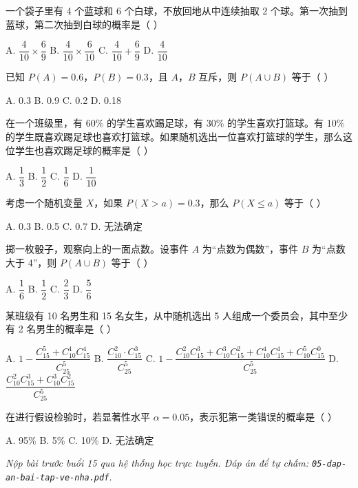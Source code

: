 \documentclass[11pt, a4paper]{article}
\begin{document}
\begin{baitap}[9]
一个袋子里有 4 个蓝球和 6 个白球，不放回地从中连续抽取 2 个球。第一次抽到蓝球，第二次抽到白球的概率是（ ）
\par\vspace{3pt}
\noindent A. $\dfrac{4}{10} \times \dfrac{6}{9}$ \quad B. $\dfrac{4}{10} \times \dfrac{6}{10}$ \quad C. $\dfrac{4}{10} + \dfrac{6}{9}$ \quad D. $\dfrac{4}{10}$
\end{baitap}

\begin{baitap}[10]
已知 $P(A)=0.6$，$P(B)=0.3$，且 $A$，$B$ 互斥，则 $P(A\cup B)$ 等于（ ）
\par\vspace{3pt}
\noindent A. 0.3 \quad B. 0.9 \quad C. 0.2 \quad D. 0.18
\end{baitap}

\begin{baitap}[11]
在一个班级里，有 60\% 的学生喜欢踢足球，有 30\% 的学生喜欢打篮球。有 10\% 的学生既喜欢踢足球也喜欢打篮球。如果随机选出一位喜欢打篮球的学生，那么这位学生也喜欢踢足球的概率是（ ）
\par\vspace{3pt}
\noindent A. $\dfrac{1}{3}$ \quad B. $\dfrac{1}{2}$ \quad C. $\dfrac{1}{6}$ \quad D. $\dfrac{1}{10}$
\end{baitap}

\begin{baitap}[12]
考虑一个随机变量 $X$，如果 $P(X>a)=0.3$，那么 $P(X\le a)$ 等于（ ）
\par\vspace{3pt}
\noindent A. 0.3 \quad B. 0.5 \quad C. 0.7 \quad D. 无法确定
\end{baitap}

\begin{baitap}[13]
掷一枚骰子，观察向上的一面点数。设事件 $A$ 为“点数为偶数”，事件 $B$ 为“点数大于 4”，则 $P(A\cup B)$ 等于（ ）
\par\vspace{3pt}
\noindent A. $\dfrac{1}{6}$ \quad B. $\dfrac{1}{2}$ \quad C. $\dfrac{2}{3}$ \quad D. $\dfrac{5}{6}$
\end{baitap}

\begin{baitap}[14]
某班级有 10 名男生和 15 名女生，从中随机选出 5 人组成一个委员会，其中至少有 2 名男生的概率是（ ）
\par\vspace{3pt}
\noindent A. $1-\dfrac{C_{15}^5+C_{10}^1C_{15}^4}{C_{25}^5}$ \quad B. $\dfrac{C_{10}^2\cdot C_{15}^3}{C_{25}^5}$ \quad C. $1-\dfrac{C_{10}^2C_{15}^3+C_{10}^3C_{15}^2+C_{10}^4C_{15}^1+C_{10}^5C_{15}^0}{C_{25}^5}$ \quad D. $\dfrac{C_{10}^2C_{15}^3+C_{10}^3C_{15}^2}{C_{25}^5}$
\end{baitap}

\begin{baitap}[15]
在进行假设检验时，若显著性水平 $\alpha=0.05$，表示犯第一类错误的概率是（ ）
\par\vspace{3pt}
\noindent A. 95\% \quad B. 5\% \quad C. 10\% \quad D. 无法确定
\end{baitap}

\vspace{0.3cm}
\noindent\emph{Nộp bài trước buổi 15 qua hệ thống học trực tuyến. Đáp án để tự chấm: \texttt{05-dap-an-bai-tap-ve-nha.pdf}.}
\end{document}
